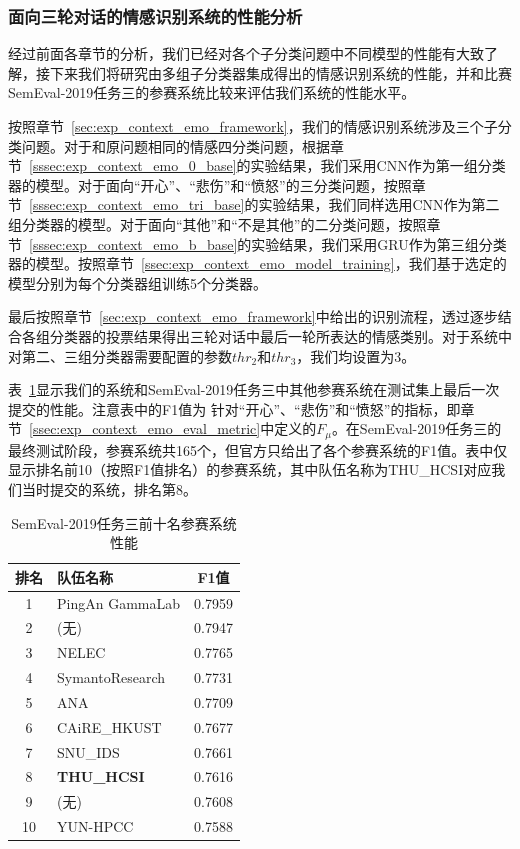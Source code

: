 \subsubsection{面向三轮对话的情感识别系统的性能分析}

经过前面各章节的分析，我们已经对各个子分类问题中不同模型的性能有大致了解，接下来我们将研究由多组子分类器集成得出的情感识别系统的性能，并和比赛SemEval-2019任务三的参赛系统比较来评估我们系统的性能水平。

按照章节~\ref{sec:exp_context_emo_framework}，我们的情感识别系统涉及三个子分类问题。对于和原问题相同的情感四分类问题，根据章节~\ref{sssec:exp_context_emo_0_base}的实验结果，我们采用CNN作为第一组分类器的模型。对于面向“开心”、“悲伤”和“愤怒”的三分类问题，按照章节~\ref{sssec:exp_context_emo_tri_base}的实验结果，我们同样选用CNN作为第二组分类器的模型。对于面向“其他”和“不是其他”的二分类问题，按照章节~\ref{sssec:exp_context_emo_b_base}的实验结果，我们采用GRU作为第三组分类器的模型。按照章节~\ref{ssec:exp_context_emo_model_training}，我们基于选定的模型分别为每个分类器组训练5个分类器。

最后按照章节~\ref{sec:exp_context_emo_framework}中给出的识别流程，透过逐步结合各组分类器的投票结果得出三轮对话中最后一轮所表达的情感类别。对于系统中对第二、三组分类器需要配置的参数$thr_2$和$thr_3$，我们均设置为3。

表~\ref{tab:exp_context_emo_other_comp}显示我们的系统和SemEval-2019任务三中其他参赛系统在测试集上最后一次提交的性能。注意表中的F1值为
针对“开心”、“悲伤”和“愤怒”的指标，即章节~\ref{ssec:exp_context_emo_eval_metric}中定义的$F_\mu$。在SemEval-2019任务三的最终测试阶段，参赛系统共165个，但官方只给出了各个参赛系统的F1值。表中仅显示排名前10（按照F1值排名）的参赛系统，其中队伍名称为THU\_HCSI对应我们当时提交的系统，排名第8。

\begin{table}[htb]
  \centering
  \begin{minipage}[t]{0.6\linewidth}
  \caption{SemEval-2019任务三前十名参赛系统性能} %
  \label{tab:exp_context_emo_other_comp}
    \begin{tabularx}{\linewidth}{c|X|c}
    \toprule[1.5pt]
    排名 & 队伍名称 & F1值 \\
    \hline
    1 & PingAn GammaLab & 0.7959 \\
    2 & (无) & 0.7947 \\
    3 & NELEC & 0.7765 \\
    4 & SymantoResearch & 0.7731 \\
    5 & ANA & 0.7709 \\
    6 & CAiRE\_HKUST & 0.7677 \\
    7 & SNU\_IDS & 0.7661 \\
    8 & \bf THU\_HCSI & 0.7616 \\
    9 & (无) & 0.7608 \\
    10 & YUN-HPCC & 0.7588 \\
    \bottomrule[1.5pt]
    \end{tabularx}
  \end{minipage}
\end{table}

